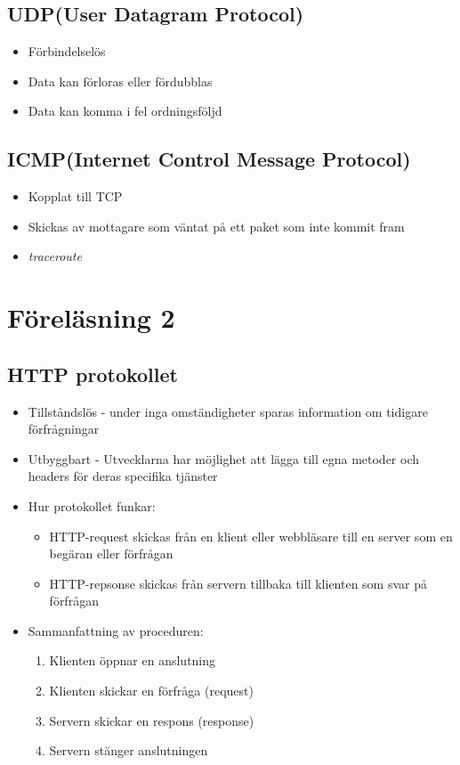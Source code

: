 \documentclass[12pt,a4paper]{article}
\begin{document}
\subsection{UDP(User Datagram Protocol)}
\begin{itemize}
    \item Förbindelselös
    \item Data kan förloras eller fördubblas
    \item Data kan komma i fel ordningsföljd
\end{itemize}

\subsection{ICMP(Internet Control Message Protocol)}
\begin{itemize}
    \item Kopplat till TCP 
    \item Skickas av mottagare som väntat på ett paket som inte kommit fram
    \item \textit{\large traceroute}
\end{itemize}

\newpage 
\section{Föreläsning 2}
\subsection{HTTP protokollet}
\begin{itemize}
    \item Tillståndslös - under inga omständigheter sparas information om tidigare förfrågningar
    \item Utbyggbart - Utvecklarna har möjlighet att lägga till egna metoder och headers för deras specifika tjänster
    \item Hur protokollet funkar:
    \begin{itemize}
        \item HTTP-request skickas från en klient eller webbläsare till en server som en begäran eller förfrågan 
        \item HTTP-repsonse skickas från servern tillbaka till klienten som svar på förfrågan
    \end{itemize}
    \item Sammanfattning av proceduren:
    \begin{enumerate}
        \item Klienten öppnar en anslutning
        \item Klienten skickar en förfråga (request)
        \item Servern skickar en respons (response)
        \item Servern stänger anslutningen
    \end{enumerate}
\end{itemize}
\end{document}
